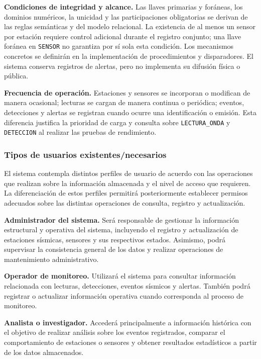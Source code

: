 \documentclass[12pt,a4paper]{article}
\begin{document}
\noindent
\textbf{Condiciones de integridad y alcance.} Las llaves primarias y foráneas, los dominios numéricos, la unicidad y las participaciones obligatorias se derivan de las reglas semánticas y del modelo relacional. La existencia de al menos un sensor por estación requiere control adicional durante el registro conjunto; una llave foránea en \texttt{SENSOR} no garantiza por sí sola esta condición. Los mecanismos concretos se definirán en la implementación de procedimientos y disparadores. El sistema conserva registros de alertas, pero no implementa su difusión física o pública.

\noindent
\textbf{Frecuencia de operación.} Estaciones y sensores se incorporan o modifican de manera ocasional; lecturas se cargan de manera continua o periódica; eventos, detecciones y alertas se registran cuando ocurre una identificación o emisión. Esta diferencia justifica la prioridad de carga y consulta sobre \texttt{LECTURA\_\allowbreak{}ONDA} y \texttt{DETECCION} al realizar las pruebas de rendimiento.


\subsubsection{Tipos de usuarios existentes/necesarios}

El sistema contempla distintos perfiles de usuario de acuerdo con las operaciones que realizan sobre la información almacenada y el nivel de acceso que requieren. La diferenciación de estos perfiles permitirá posteriormente establecer permisos adecuados sobre las distintas operaciones de consulta, registro y actualización.

\textbf{Administrador del sistema.}
Será responsable de gestionar la información estructural y operativa del sistema, incluyendo el registro y actualización de estaciones sísmicas, sensores y sus respectivos estados. Asimismo, podrá supervisar la consistencia general de los datos y realizar operaciones de mantenimiento administrativo.

\textbf{Operador de monitoreo.}
Utilizará el sistema para consultar información relacionada con lecturas, detecciones, eventos sísmicos y alertas. También podrá registrar o actualizar información operativa cuando corresponda al proceso de monitoreo.

\textbf{Analista o investigador.}
Accederá principalmente a información histórica con el objetivo de realizar análisis sobre los eventos registrados, comparar el comportamiento de estaciones o sensores y obtener resultados estadísticos a partir de los datos almacenados.
\end{document}
